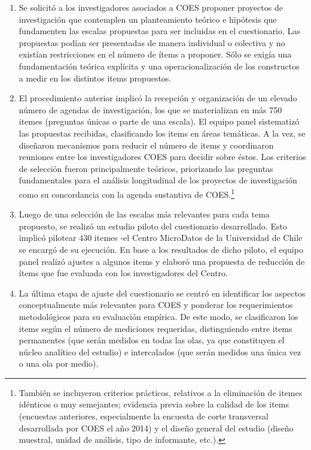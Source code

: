 \documentclass[
]{book}
\begin{document}
\begin{enumerate}
\def\labelenumi{\arabic{enumi}.}
\item
  Se solicitó a los investigadores asociados a COES proponer proyectos de investigación que contemplen un planteamiento teórico e hipótesis que fundamenten las escalas propuestas para ser incluidas en el cuestionario. Las propuestas podían ser presentadas de manera individual o colectiva y no existían restricciones en el número de ítems a proponer. Sólo se exigía una fundamentación teórica explícita y una operacionalización de los constructos a medir en los distintos items propuestos.
\item
  El procedimiento anterior implicó la recepción y organización de un elevado número de agendas de investigación, los que se materializan en más 750 itemes (preguntas únicas o parte de una escala). El equipo panel sistematizó las propuestas recibidas, clasificando los items en áreas temáticas. A la vez, se diseñaron mecanismos para reducir el número de items y coordinaron reuniones entre los investigadores COES para decidir sobre éstos. Los criterios de selección fueron principalmente teóricos, priorizando las preguntas fundamentales para el análisis longitudinal de los proyectos de investigación como su concordancia con la agenda sustantiva de COES.\footnote{También se incluyeron criterios prácticos, relativos a la eliminación de itemes idénticos o muy semejantes; evidencia previa sobre la calidad de los items (encuestas anteriores, especialmente la encuesta de corte transversal desarrollada por COES el año 2014) y el diseño general del estudio (diseño muestral, unidad de análisis, tipo de informante, etc.).}
\item
  Luego de una selección de las escalas más relevantes para cada tema propuesto, se realizó un estudio piloto del cuestionario desarrollado. Esto implicó pilotear 430 itemes -el Centro MicroDatos de la Universidad de Chile se encargó de su ejecución. En base a los resultados de dicho piloto, el equipo panel realizó ajustes a algunos items y elaboró una propuesta de reducción de ítems que fue evaluada con los investigadores del Centro.
\item
  La última etapa de ajuste del cuestionario se centró en identificar los aspectos conceptualmente más relevantes para COES y ponderar los requerimientos metodológicos para su evaluación empírica. De este modo, se clasificaron los items según el número de mediciones requeridas, distinguiendo entre items permanentes (que serán medidos en todas las olas, ya que constituyen el núcleo analítico del estudio) e intercalados (que serán medidos una única vez o una ola por medio).
\end{enumerate}
\end{document}
